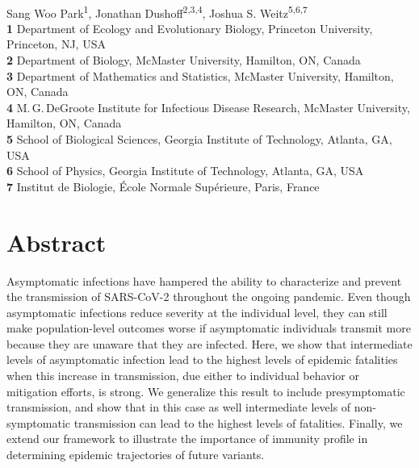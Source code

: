 \documentclass[12pt]{article}
\date{\today}
\begin{document}
\begin{flushleft}{
	\Large
	\textbf{}
}
\newline
\\
Sang Woo Park\textsuperscript{1},
Jonathan Dushoff\textsuperscript{2,3,4},
Joshua S. Weitz\textsuperscript{5,6,7}
\\
\bigskip
\textbf{1} Department of Ecology and Evolutionary Biology, Princeton University, Princeton, NJ, USA
\\
\textbf{2} Department of Biology, McMaster University, Hamilton, ON, Canada
\\
\textbf{3} Department of Mathematics and Statistics, McMaster University, Hamilton, ON, Canada
\\
\textbf{4} M.\,G.\,DeGroote Institute for Infectious Disease Research, McMaster University, Hamilton, ON, Canada
\\
\textbf{5} School of Biological Sciences, Georgia Institute of Technology, Atlanta, GA, USA
\\
\textbf{6} School of Physics, Georgia Institute of Technology, Atlanta, GA, USA
\\
\textbf{7} Institut de Biologie, \'{E}cole Normale Sup\'{e}rieure, Paris, France
\\
\bigskip

\bigskip
\end{flushleft}

\section*{Abstract}

Asymptomatic infections have hampered the ability to characterize and prevent the transmission of SARS-CoV-2 throughout the ongoing pandemic.
Even though asymptomatic infections reduce severity at the individual level, they can still make population-level outcomes worse if asymptomatic individuals transmit more because they are unaware that they are infected.
Here, we show that intermediate levels of asymptomatic infection lead to the highest levels of epidemic fatalities when this increase in transmission, due either to individual behavior or mitigation efforts, is strong. 
We generalize this result to include presymptomatic transmission, and show that in this case as well intermediate levels of non-symptomatic transmission can lead to the highest levels of fatalities.
Finally, we extend our framework to illustrate the importance of immunity profile in determining epidemic trajectories of future variants. 
\end{document}
